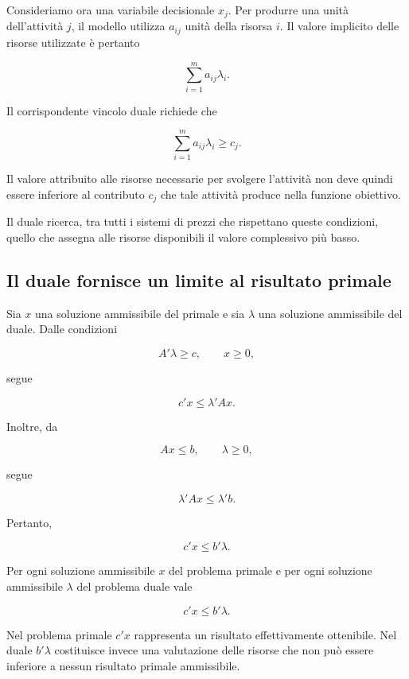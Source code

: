Consideriamo ora una variabile decisionale \(x_j\). Per produrre una unit\`{a}
dell'attivit\`{a} \(j\), il modello utilizza \(a_{ij}\) unit\`{a} della
risorsa \(i\). Il valore implicito delle risorse utilizzate \`{e} pertanto

\[
\sum_{i=1}^{m}a_{ij}\lambda_i.
\]

Il corrispondente vincolo duale richiede che

\[
\sum_{i=1}^{m}a_{ij}\lambda_i
\geq
c_j.
\]

Il valore attribuito alle risorse necessarie per svolgere l'attivit\`{a} non
deve quindi essere inferiore al contributo \(c_j\) che tale attivit\`{a}
produce nella funzione obiettivo.

Il duale ricerca, tra tutti i sistemi di prezzi che rispettano queste
condizioni, quello che assegna alle risorse disponibili il valore complessivo
pi\`{u} basso.

\subsection{Il duale fornisce un limite al risultato primale}

Sia \(x\) una soluzione ammissibile del primale e sia \(\lambda\) una
soluzione ammissibile del duale. Dalle condizioni

\[
A'\lambda\geq c,
\qquad
x\geq0,
\]

\noindent segue

\[
c'x\leq\lambda'Ax.
\]

Inoltre, da

\[
Ax\leq b,
\qquad
\lambda\geq0,
\]

segue

\[
\lambda'Ax\leq\lambda'b.
\]

Pertanto,

\[
c'x
\leq
b'\lambda.
\]

\begin{proposition}

Per ogni soluzione ammissibile \(x\) del problema primale e per ogni soluzione
ammissibile \(\lambda\) del problema duale vale

\[
c'x\leq b'\lambda.
\]

\end{proposition}

Nel problema primale \(c'x\) rappresenta un risultato effettivamente
ottenibile. Nel duale \(b'\lambda\) costituisce invece una valutazione delle
risorse che non pu\`{o} essere inferiore a nessun risultato primale
ammissibile.


